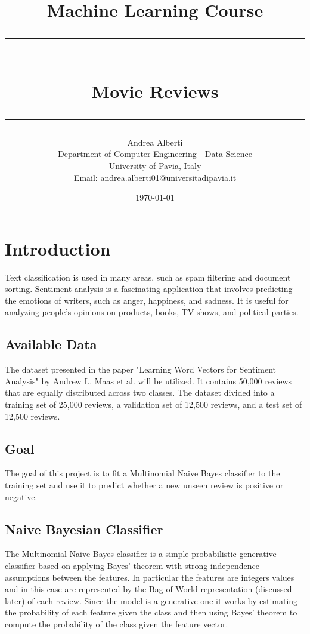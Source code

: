 \documentclass{article}
\title{\Large Machine Learning Course\vspace{0.8cm}\\
    \rule{\textwidth}{0.3pt}\vspace{0.3cm}\\
    \textbf{Movie Reviews}\vspace{0.1cm}\\
    \rule{\textwidth}{0.3pt}\vspace{0.8cm}}
\author{Andrea Alberti\vspace{0.5cm}\\
    \small Department of Computer Engineering - Data Science\\[0.2cm]
    \small University of Pavia, Italy \\
    \small Email: andrea.alberti01@universitadipavia.it}\vspace{0.5cm}
\date{\today}
\begin{document}
\begin{titlepage}
    \maketitle
    \thispagestyle{empty}
\end{titlepage}

\tableofcontents
\thispagestyle{empty}

\newpage
{}




    
\section{Introduction}
Text classification is used in many areas, such as spam filtering and document sorting. Sentiment analysis is a fascinating application that involves predicting the 
emotions of writers, such as anger, happiness, and sadness. It is useful for analyzing people's opinions on products, books, TV shows, and political parties.

\subsection{Available Data}
The dataset presented in the paper "Learning Word Vectors for Sentiment Analysis" by Andrew L. Maas et al. will be utilized. It contains 50,000 reviews that are 
equally distributed across two classes. The dataset divided into a training set of 25,000 reviews, a validation set of 12,500 reviews, and a test set of 
12,500 reviews.
\subsection{Goal}
The goal of this project is to fit a Multinomial Naive Bayes classifier to the training set and use it to predict whether a new unseen review is positive or negative.

\subsection{Naive Bayesian Classifier}
The Multinomial Naive Bayes classifier is a simple probabilistic generative classifier based on applying Bayes' theorem with strong independence assumptions between the features.
In particular the features are integers values and in this case are represented by the Bag of World representation (discussed later) of each review. Since the model is a generative
one it works by estimating the probability of each feature given the class and then using Bayes' theorem to compute the probability of the class given the feature vector.
\end{document}
